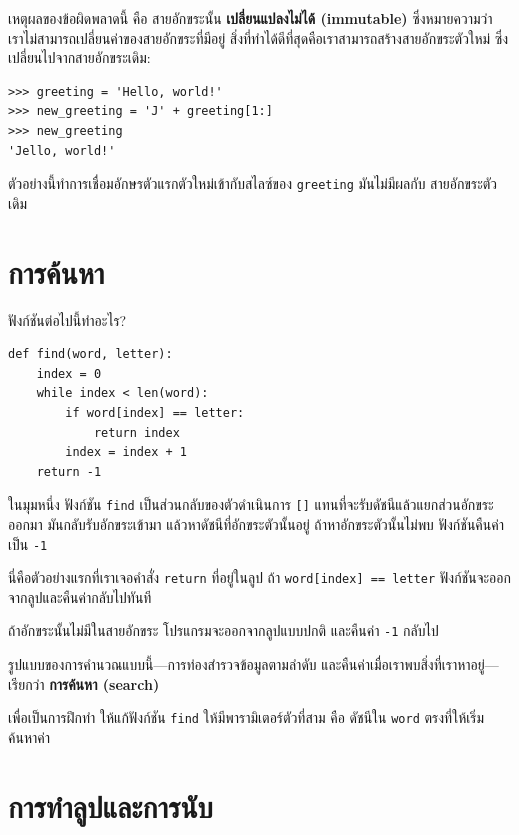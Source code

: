 เหตุผลของข้อผิดพลาดนี้ คือ สายอักขระนั้น {\bf เปลี่ยนแปลงไม่ได้ (immutable)} ซึ่งหมายความว่า
เราไม่สามารถเปลี่ยนค่าของสายอักขระที่มีอยู่ สิ่งที่ทำได้ดีที่สุดคือเราสามารถสร้างสายอักขระตัวใหม่
ซึ่งเปลี่ยนไปจากสายอักขระเดิม:

\begin{verbatim}
>>> greeting = 'Hello, world!'
>>> new_greeting = 'J' + greeting[1:]
>>> new_greeting
'Jello, world!'
\end{verbatim}
%
ตัวอย่างนี้ทำการเชื่อมอักษรตัวแรกตัวใหม่เข้ากับสไลซ์ของ {\tt greeting} มันไม่มีผลกับ
สายอักขระตัวเดิม


\section{การค้นหา} %
\label{find}

ฟังก์ชันต่อไปนี้ทำอะไร?

\begin{verbatim}
def find(word, letter):
    index = 0
    while index < len(word):
        if word[index] == letter:
            return index
        index = index + 1
    return -1
\end{verbatim}
%
ในมุมหนึ่ง ฟังก์ชัน {\tt find} เป็นส่วนกลับของตัวดำเนินการ {\tt []} 
แทนที่จะรับดัชนีแล้วแยกส่วนอักขระออกมา มันกลับรับอักขระเข้ามา แล้วหาดัชนีที่อักขระตัวนั้นอยู่
ถ้าหาอักขระตัวนั้นไม่พบ ฟังก์ชันคืนค่าเป็น {\tt -1}

นี่คือตัวอย่างแรกที่เราเจอคำสั่ง {\tt return} ที่อยู่ในลูป ถ้า {\tt word[index] == letter}
ฟังก์ชันจะออกจากลูปและคืนค่ากลับไปทันที

ถ้าอักขระนั้นไม่มีในสายอักขระ โปรแกรมจะออกจากลูปแบบปกติ และคืนค่า {\tt -1} กลับไป

รูปแบบของการคำนวณแบบนี้---การท่องสำรวจข้อมูลตามลำดับ และคืนค่าเมื่อเราพบสิ่งที่เราหาอยู่---
เรียกว่า {\bf การค้นหา (search)}

เพื่อเป็นการฝึกทำ ให้แก้ฟังก์ชัน {\tt find} ให้มีพารามิเตอร์ตัวที่สาม คือ ดัชนีใน 
{\tt word} ตรงที่ให้เริ่มค้นหาค่า


\section{การทำลูปและการนับ} %
\label{counter}

